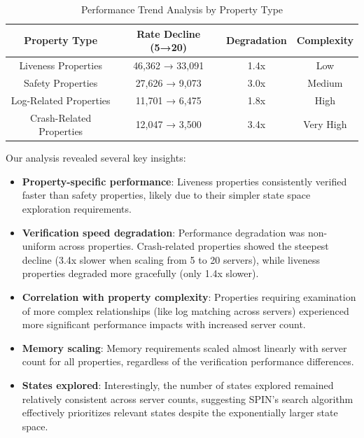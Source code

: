 \documentclass[a4paper]{llncs}
\renewcommand{\arraystretch}{0.85} %
\newcommand{\compacttable}[1]{%
  \begingroup
  \scriptsize
  \setlength{\tabcolsep}{2.5pt}%
  \renewcommand{\arraystretch}{0.8}%
  #1%
  \endgroup
}
\begin{document}
\begin{table}[!htbp]
\centering
\caption{Performance Trend Analysis by Property Type}
\label{tab:performance-trends}
\compacttable{
\begin{tabular}{|c|c|c|c|}
\hline
\textbf{Property Type} & \textbf{Rate Decline (5→20)} & \textbf{Degradation} & \textbf{Complexity} \\
\hline
Liveness Properties & 46,362 → 33,091 & 1.4x & Low \\
\hline
Safety Properties & 27,626 → 9,073 & 3.0x & Medium \\
\hline
Log-Related Properties & 11,701 → 6,475 & 1.8x & High \\
\hline
Crash-Related Properties & 12,047 → 3,500 & 3.4x & Very High \\
\hline
\end{tabular}
}
\end{table}

Our analysis revealed several key insights:

\begin{itemize}
    \item \textbf{Property-specific performance}: Liveness properties consistently verified faster than safety properties, likely due to their simpler state space exploration requirements.
    
    \item \textbf{Verification speed degradation}: Performance degradation was non-uniform across properties. Crash-related properties showed the steepest decline (3.4x slower when scaling from 5 to 20 servers), while liveness properties degraded more gracefully (only 1.4x slower).
    
    \item \textbf{Correlation with property complexity}: Properties requiring examination of more complex relationships (like log matching across servers) experienced more significant performance impacts with increased server count.
    
    \item \textbf{Memory scaling}: Memory requirements scaled almost linearly with server count for all properties, regardless of the verification performance differences.
    
    \item \textbf{States explored}: Interestingly, the number of states explored remained relatively consistent across server counts, suggesting SPIN's search algorithm effectively prioritizes relevant states despite the exponentially larger state space.
\end{itemize}
\end{document}
